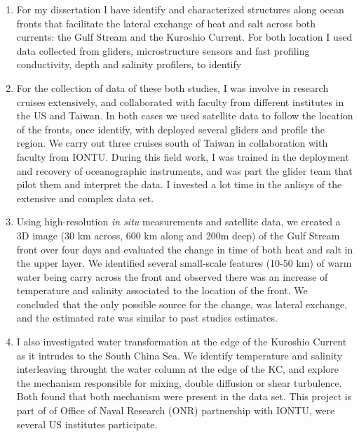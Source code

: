 \documentclass[letterpaper, 12pt ]{article}
\begin{document}
  \begin{enumerate}
  
    \item For my dissertation I have identify and characterized structures along ocean fronts that facilitate the lateral exchange of heat and salt across both currents: the Gulf Stream and the Kuroshio Current. For both location I used data collected from gliders, microstructure sensors and fast profiling conductivity, depth and salinity profilers, to identify
    
    
    \item For the collection of data of these both studies, I was involve in research cruises extensively, and collaborated with faculty from different institutes in the US and Taiwan. In both cases we used satellite data to follow the location of the fronts, once identify, with deployed several gliders and profile the region. We carry out three cruises south of Taiwan in collaboration with faculty from IONTU. During this field work, I was trained in the deployment and recovery of oceanographic instruments, and was part the glider team that pilot them and interpret the data.  I invested a lot time in the anlisys of the extensive and complex data set.
    
    \item Using high-resolution \textit{in situ} measurements and satellite data, we created a 3D image (30 km across, 600 km along and 200m deep) of the Gulf Stream front over four days and evaluated the change in time of both heat and salt in the upper layer. We identified several small-scale features (10-50 km) of warm water being carry across the front and observed there was an increase of temperature and salinity associated to the location of the front. We concluded that the only possible source for the change, was lateral exchange, and the estimated rate was similar to past studies estimates. 
    
    \item I also investigated  water transformation at the edge of the Kuroshio Current as it intrudes to the South China Sea. We identify temperature and salinity interleaving throught the water column at the edge of the KC, and explore the mechanism  responsible for mixing, double diffusion or shear turbulence. Both found that both mechanism were present in the data set. This project is part of of Office of Naval Research (ONR) partnership with IONTU, were several US institutes participate. 
    

\end{enumerate}
\end{document}
